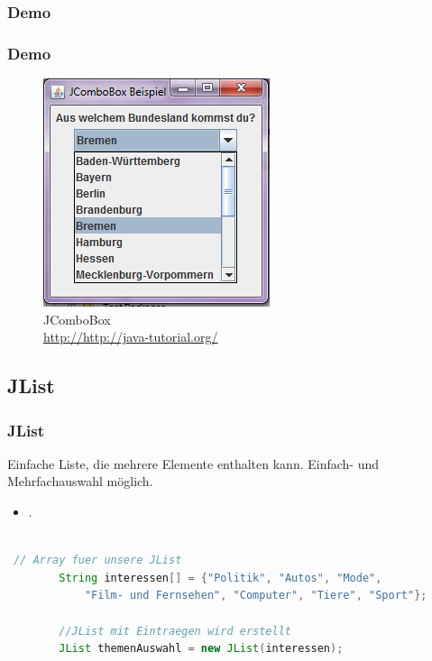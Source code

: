 \documentclass[xcolor=dvipsnames]{beamer}
\begin{document}
\subsubsection{Demo}
\begin{frame}
  \frametitle{Demo}
	\begin{figure}
		\includegraphics[scale=0.8]{images/jcombobox.PNG}
		\caption{JComboBox \\ \tiny{\textcolor{gray}{\url{http://http://java-tutorial.org/}}}}
		\end{figure}
\end{frame}


\subsection{JList}
\begin{frame}  %
  \frametitle{JList} %
  \begin{block}{Einfache Liste, die mehrere Elemente enthalten kann. Einfach- und Mehrfachauswahl möglich.}
	  \begin{itemize}
		\item .
	  \end{itemize}
  \end{block}

\begin{lstlisting}[language=java,basicstyle=\scriptsize\ttfamily]

 // Array fuer unsere JList
        String interessen[] = {"Politik", "Autos", "Mode", 
            "Film- und Fernsehen", "Computer", "Tiere", "Sport"};
 
        //JList mit Eintraegen wird erstellt
        JList themenAuswahl = new JList(interessen);

\end{lstlisting}

\end{frame}
\end{document}
